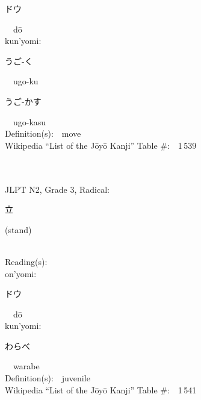 \begin{multicols}{2}
{\hspace*{2em}}{\begin{CJK}{UTF8}{min} ドウ \end{CJK}}\ \ d\=o\ \ \\
{\hspace*{1em}}kun'yomi:\ \ \\
{\hspace*{2em}}{\begin{CJK}{UTF8}{min} うご-く \end{CJK}}\ \ ugo-ku\ \ \\
{\hspace*{2em}}{\begin{CJK}{UTF8}{min} うご-かす \end{CJK}}\ \ ugo-kasu\ \ \\
Definition(s):\ \ move \\
Wikipedia ``List of the J\=oy\=o Kanji'' Table \#:\ \ 1\,539 \\
\ \ \\
{\fontsize{34pt}{40pt}  }\ \ \\  %
{JLPT N2, Grade 3, Radical:\ \ {\begin{CJK}{UTF8}{min} 立 \end{CJK}} (stand) } \\
Reading(s):\ \ \\
{\hspace*{1em}}on'yomi:\ \ \\
{\hspace*{2em}}{\begin{CJK}{UTF8}{min} ドウ \end{CJK}}\ \ d\=o\ \ \\
{\hspace*{1em}}kun'yomi:\ \ \\
{\hspace*{2em}}{\begin{CJK}{UTF8}{min} わらべ \end{CJK}}\ \ warabe\ \ \\
Definition(s):\ \ juvenile \\
Wikipedia ``List of the J\=oy\=o Kanji'' Table \#:\ \ 1\,541 \\
\ \ \\
{\fontsize{34pt}{40pt}  }\ \ \\  %

\end{multicols}
